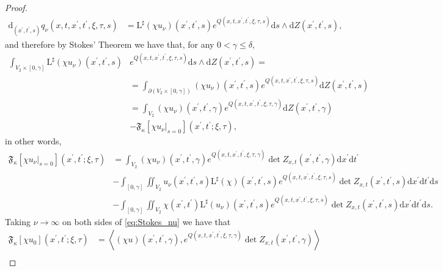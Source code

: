 \documentclass[11pt]{amsart}
\theoremstyle{definition}
\theoremstyle{remark}
\theoremstyle{plain}
\begin{document}
\begin{proof}
\begin{align*}
	\mathrm{d}_{(x^\prime, t^\prime, s)} q_\nu(x,t,x^\prime, t^\prime, \xi,\tau, s) & = \mathrm{L}^\sharp(\chi u_\nu)(x^\prime, t^\prime, s)e^{Q(x,t,x^\prime, t^\prime, \xi,\tau, s)} \mathrm{d} s \wedge \mathrm{d}Z(x^\prime,t^\prime, s),
\end{align*}
%
and therefore by Stokes' Theorem we have that, for any $0 < \gamma \leq \delta$,
%
\begin{align}\label{eq:Stokes1}
	\int_{V_2 \times [0, \gamma]}\mathrm{L}^\sharp(\chi u_\nu)(x^\prime, t^\prime, s) & e^{Q(x,t,x^\prime, t^\prime, \xi,\tau, s)}  \mathrm{d} s \wedge \mathrm{d}Z(x^\prime,t^\prime, s) = \\ \nonumber
	& = \int_{\partial(V_2 \times [0, \gamma])}(\chi u_\nu)(x^\prime, t^\prime, s)e^{Q(x,t,x^\prime, t^\prime, \xi,\tau, s)}  \mathrm{d}Z(x^\prime,t^\prime, s) \\ \nonumber
	& = \int_{V_2}(\chi u_\nu)(x^\prime, t^\prime, \gamma)e^{Q(x,t,x^\prime, t^\prime, \xi,\tau, \gamma)}  \mathrm{d}Z(x^\prime,t^\prime, \gamma) \\ \nonumber
	& - \mathfrak{F}_\kappa[\chi u_\nu|_{s=0}](x^\prime, t^\prime;\xi,\tau),
\end{align}
%
in other words,
%
\begin{align}\label{eq:Stokes_nu}
	\mathfrak{F}_\kappa[\chi u_\nu|_{s=0}](x^\prime, t^\prime;\xi,\tau)  &=  \int_{V_2}(\chi u_\nu)(x^\prime, t^\prime, \gamma)e^{Q(x,t,x^\prime, t^\prime, \xi,\tau, \gamma)}  \det Z_{x,t}(x^\prime,t^\prime, \gamma) \mathrm{d} x^\prime \mathrm{d} t^\prime \\ \nonumber
	& - \int_{[0, \gamma]} \iint_{V_2 }u_\nu(x^\prime,t^\prime,s)\mathrm{L}^\sharp(\chi)(x^\prime, t^\prime, s)  e^{Q(x,t,x^\prime, t^\prime, \xi,\tau, s)}   \det Z_{x,t}(x^\prime,t^\prime, s) \mathrm{d} x^\prime \mathrm{d} t^\prime \mathrm{d} s  \\ \nonumber
	& - \int_{[0, \gamma]} \iint_{V_2 }\chi(x^\prime,t^\prime)\mathrm{L}^\sharp(u_\nu)(x^\prime, t^\prime, s)  e^{Q(x,t,x^\prime, t^\prime, \xi,\tau, s)}   \det Z_{x,t}(x^\prime,t^\prime, s) \mathrm{d} x^\prime \mathrm{d} t^\prime \mathrm{d} s .
\end{align}
%
Taking $\nu \rightarrow \infty$ on both sides of \eqref{eq:Stokes_nu} we have that
%
\begin{align}\label{eq:Stokes2}
	\mathfrak{F}_\kappa[\chi u_0](x^\prime, t^\prime;\xi,\tau) & = \left\langle (\chi u)(x^\prime, t^\prime, \gamma), e^{Q(x,t,x^\prime, t^\prime, \xi,\tau, \gamma)} \det Z_{x,t}(x^\prime,t^\prime, \gamma) \right\rangle \\ \nonumber

\end{align}
\end{proof}
\end{document}
